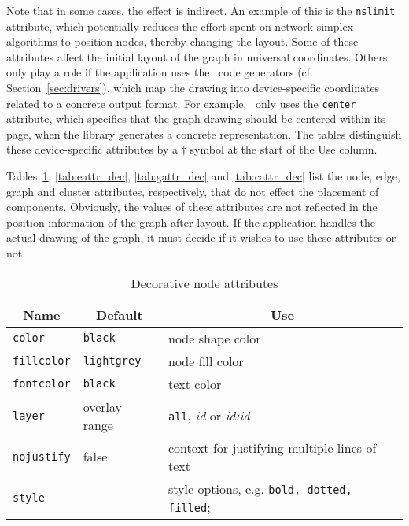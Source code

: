 Note that in some cases, the effect is indirect. An example of this is the
{\tt nslimit} attribute, which potentially reduces the effort spent on
network simplex algorithms to position nodes, thereby changing the layout.
Some of these attributes affect the initial layout of the graph in universal
coordinates. Others only play a role if the application uses the \gviz\
code generators (cf. Section~\ref{sec:drivers}), 
which map the drawing into device-specific coordinates related to a
concrete output format.
For example, \gviz\ only uses the {\tt center} attribute, which specifies
that the graph drawing should be centered within its page, when the library
generates a concrete representation.
The tables distinguish these device-specific attributes by
a $\dagger$ symbol at the start of the Use column.

Tables~\ref{tab:nattr_dec}, \ref{tab:eattr_dec}, \ref{tab:gattr_dec} and
\ref{tab:cattr_dec} list the node, edge, graph and cluster 
attributes, respectively,
that do not effect the placement of components.
Obviously, the values of these attributes are not reflected in the
position information of the graph after layout. If the application
handles the actual drawing of the graph, it must decide if it wishes
to use these attributes or not.
\begin{table}[htbp]\footnotesize
\centering
\begin{tabular}[t]{|l|l|p{2.5in}|} \hline
\multicolumn{1}{|c|}{Name} & \multicolumn{1}{c|}{Default} & \multicolumn{1}{c|}{Use} \\ \hline
{\tt color} & {\tt black} & node shape color \\
{\tt fillcolor} & {\tt lightgrey} & node fill color \\
{\tt fontcolor} & {\tt black} & text color \\
{\tt layer} & overlay range & {\tt all}, {\it id} or {\it id:id} \\
{\tt nojustify} & false & context for justifying multiple lines of text \\
{\tt style} & & style options, e.g. {\tt bold, dotted, filled}; \\ 
\hline
\end{tabular}
\caption{Decorative node attributes}
\label{tab:nattr_dec}
\end{table}
